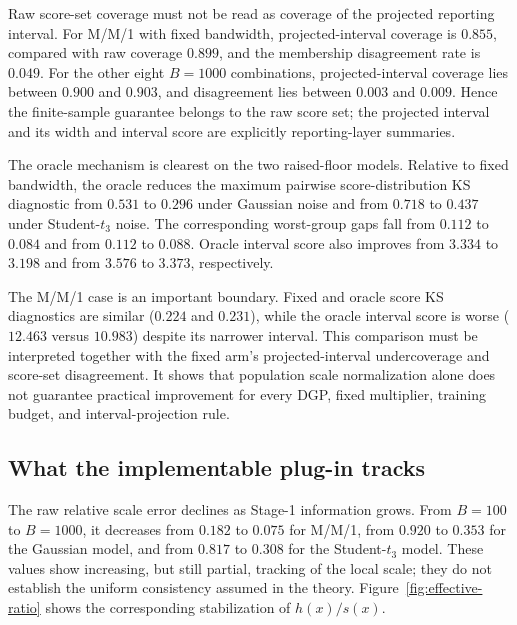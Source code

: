 \documentclass[11pt]{article}
\begin{document}


Raw score-set coverage must not be read as coverage of the projected reporting
interval. For M/M/1 with fixed bandwidth, projected-interval coverage is
\(0.855\), compared with raw coverage \(0.899\), and the membership
disagreement rate is \(0.049\). For the other eight \(B=1000\) combinations,
projected-interval coverage lies between \(0.900\) and \(0.903\), and
disagreement lies between \(0.003\) and \(0.009\). Hence the finite-sample
guarantee belongs to the raw score set; the projected interval and its
width and interval score are explicitly reporting-layer summaries.

The oracle mechanism is clearest on the two raised-floor models. Relative to fixed bandwidth, the oracle reduces the maximum pairwise score-distribution KS diagnostic from \(0.531\) to \(0.296\) under Gaussian noise and from \(0.718\) to \(0.437\) under Student-\(t_3\) noise. The corresponding worst-group gaps fall from \(0.112\) to \(0.084\) and from \(0.112\) to \(0.088\). Oracle interval score also improves from \(3.334\) to \(3.198\) and from \(3.576\) to \(3.373\), respectively.

The M/M/1 case is an important boundary. Fixed and oracle score KS diagnostics are similar (\(0.224\) and \(0.231\)), while the oracle interval score is worse (\(12.463\) versus \(10.983\)) despite its narrower interval. This comparison must be interpreted together with the fixed arm's projected-interval undercoverage and score-set disagreement. It shows that population scale normalization alone does not guarantee practical improvement for every DGP, fixed multiplier, training budget, and interval-projection rule.

\subsection{What the implementable plug-in tracks}

The raw relative scale error declines as Stage-1 information grows. From \(B=100\) to \(B=1000\), it decreases from \(0.182\) to \(0.075\) for M/M/1, from \(0.920\) to \(0.353\) for the Gaussian model, and from \(0.817\) to \(0.308\) for the Student-\(t_3\) model. These values show increasing, but still partial, tracking of the local scale; they do not establish the uniform consistency assumed in the theory. Figure~\ref{fig:effective-ratio} shows the corresponding stabilization of \(h(x)/s(x)\).
\end{document}

